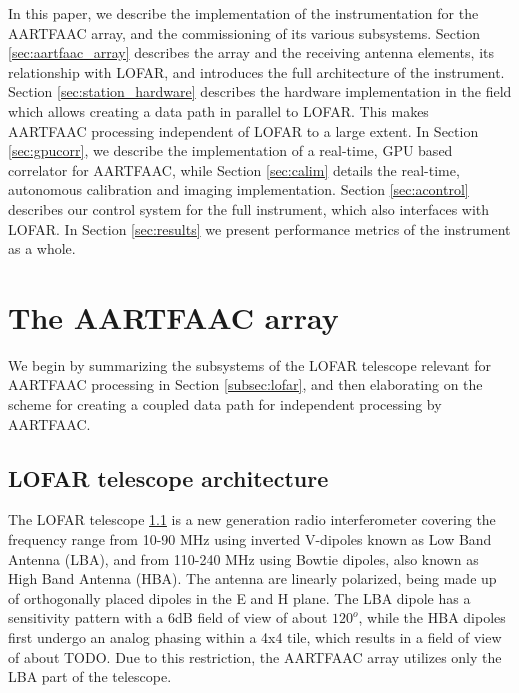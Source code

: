 \documentclass{aa}
\begin{document}
\begin{itemize}
In this  paper, we describe  the implementation  of the instrumentation  for the
AARTFAAC  array,  and the  commissioning  of  its various  subsystems.   Section
\ref{sec:aartfaac_array} describes the array and the receiving antenna elements,
its  relationship  with LOFAR,  and  introduces  the  full architecture  of  the
instrument.    Section   \ref{sec:station_hardware}   describes   the   hardware
implementation in  the field which  allows creating a  data path in  parallel to
LOFAR. This  makes AARTFAAC processing independent  of LOFAR to a  large extent.
In Section \ref{sec:gpucorr}, we describe the implementation of a real-time, GPU
based  correlator  for  AARTFAAC,  while  Section  \ref{sec:calim}  details  the
real-time,   autonomous  calibration   and   imaging  implementation.    Section
\ref{sec:acontrol} describes our  control system for the  full instrument, which
also interfaces with LOFAR.  In Section \ref{sec:results} we present performance
metrics of the instrument as a whole.
\end{itemize}

\section {\label{sec:aartfaac_array}The AARTFAAC array}
We  begin by  summarizing the  subsystems of  the LOFAR  telescope relevant  for
AARTFAAC processing in  Section \ref{subsec:lofar}, and then  elaborating on the
scheme for creating a coupled data path for independent processing by AARTFAAC.

\subsection {\label{subsec:lofar} LOFAR telescope architecture}
The LOFAR telescope \ref{} is a new generation radio interferometer covering the
frequency  range from  10-90  MHz using  inverted V-dipoles  known  as Low  Band
Antenna (LBA),  and from 110-240  MHz using Bowtie  dipoles, also known  as High
Band  Antenna (HBA).   The  antenna are  linearly polarized,  being  made up  of
orthogonally  placed  dipoles in  the  E  and H  plane.  The  LBA dipole  has  a
sensitivity pattern  with a 6dB  field of view of  about $120^o$, while  the HBA
dipoles first undergo  an analog phasing within  a 4x4 tile, which  results in a
field  of view  of  about TODO.  Due  to this  restriction,  the AARTFAAC  array
utilizes only the LBA part of the telescope.
\end{document}
